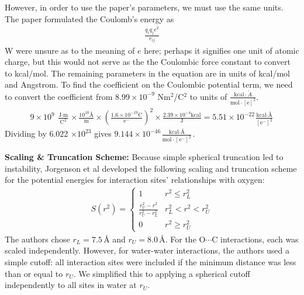 \documentclass[12pt]{article}
\begin{document}
However, in order to use the paper's parameters, we must use the same units. The paper formulated the Coulomb's energy as 
\begin{gather*}
    \frac{q_{i}q_{j}e^{2}}{r_{ij}}
\end{gather*}
W were unsure as to the meaning of $e$ here; perhaps it signifies one unit of atomic charge, but this would not serve as the the Coulombic force constant to convert to kcal/mol. The remaining parameters in the equation are in units of kcal/mol and Angstrom. To find the coefficient on the Coulombic potential term, we need to convert the coefficient from $8.99 \times 10^{-9}$ Nm$^{2}$/C$^{2}$ to units of $\frac{\text{kcal} \cdot  \mathring{A}}{\text{mol} \cdot [\text{e}]^{2}}$.
\begin{gather*}
    9 \times 10^{9} \; \frac{\text{J}\cdot \text{m}}{\text{C}^{2}} \times \frac{10^{10} \text{\AA}}{\text{m}} \times \left(\frac{1.6 \times 10^{-19} \text{C}}{\text{e}^{-}}\right)^{2} \times \frac{2.39 \times 10^{-4} \text{kcal}}{\text{J}} = 5.51 \times 10 ^{-22} \frac{\text{kcal} \cdot \text{\AA}}{[\text{e}^{-}]^{2}}
\end{gather*}
Dividing by 6.022 $\times 10^{23}$ gives $9.144 \times 10^{-46} \frac{\text{kcal} \cdot \text{\AA}}{\text{mol} \cdot [\text{e}^{-}]^{2}}$.

\textbf{Scaling \& Truncation Scheme:} Because simple spherical truncation led to instability, Jorgenson et al developed the following scaling and truncation scheme for the potential energies for interaction sites' relationships with oxygen:
\begin{gather*}
     S(r^{2}) = \begin{cases} 
      1 & r^{2} \leq r_{L}^{2} \\
      \frac{r_{U}^{2} - r^{2}}{r_{U}^{2} - r_{L}^{2}} & r_{L}^{2} < r^{2} < r_{U}^{2} \\
      0 & r^{2} \geq r_{U}^{2} 
   \end{cases}
\end{gather*}
The authors chose $r_{L} = 7.5\,\text{\AA}$ and $r_{U} = 8.0\,\text{\AA}$. For the O$\cdots$C interactions, each was scaled independently. However, for water-water interactions, the authors used a simple cutoff: all interaction sites were included if the minimum distance was less than or equal to $r_{U}$. We simplified this to applying a spherical cutoff independently to all sites in water at $r_{U}$.
\end{document}
